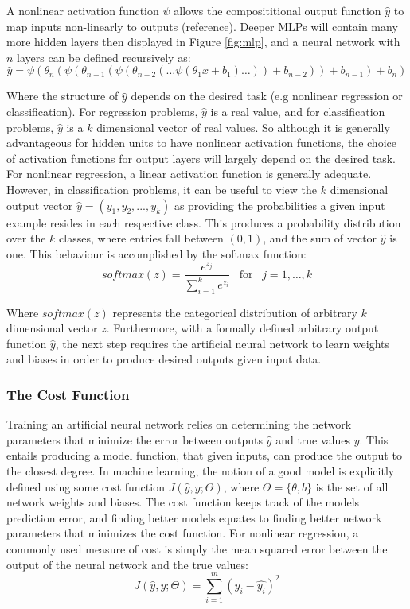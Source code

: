 A nonlinear activation function $\psi$ allows the composititional output function $ \hat{y}$ to map inputs non-linearly to outputs (reference). Deeper MLPs will contain many more hidden layers then displayed in Figure \ref{fig:mlp}, and a neural network with $n$ layers can be defined recursively as:
\begin{equation}
        \hat{y} = \psi(\theta_{n}(\psi(\theta_{n-1}(\psi(\theta_{n-2}(\ldots \psi(\theta_{1} x + b_{1}) \ldots)) + b_{n-2})) + b_{n-1}) + b_{n}) 
\end{equation}

Where the structure of $\hat{y}$ depends on the desired task (e.g nonlinear regression or classification). For regression problems, $\hat{y}$ is a real value, and for classification problems, $\hat{y}$ is a $k$ dimensional vector of real values. So although it is generally advantageous for hidden units to have nonlinear activation functions, the choice of activation functions for output layers will largely depend on the desired task. For nonlinear regression, a linear activation function is generally adequate. However, in classification problems, it can be useful to view the $k$ dimensional output vector $\hat{y} = (y_1,y_2,..., y_k)$ as providing the probabilities a given input example resides in each respective class. This produces a probability distribution over the $k$ classes, where entries fall between $(0,1)$, and the sum of vector $\hat{y}$ is one. This behaviour is accomplished by the softmax function:
\begin{equation}
       softmax(z) =  \frac{e^{z_j}}{\sum_{i=1}^{k}e^{z_i}} \;\;\; \mbox{for} \;\;\; j = 1,\ldots,k
\end{equation}

Where $softmax(z)$ represents the categorical distribution of arbitrary $k$ dimensional vector $z$. Furthermore, with a formally defined arbitrary output function $\hat{y}$, the next step requires the artificial neural network to learn weights and biases in order to produce desired outputs given input data.

\subsubsection{The Cost Function}
Training an artificial neural network relies on determining the network parameters that minimize the error between outputs $\hat{y}$ and true values $y$. This entails producing a model function, that given inputs, can produce the output to the closest degree. In machine learning, the notion of a good model is explicitly defined using some cost function $J(\hat{y},y;\Theta)$, where $\Theta = \{\theta, b\}$ is the set of all network weights and biases. The cost function keeps track of the models prediction error, and finding better models equates to finding better network parameters that minimizes the cost function. For nonlinear regression, a commonly used measure of cost is simply the mean squared error between the output of the neural network and the true values:
\begin{equation} \label{eq:mse} 
    J(\hat{y},y;\Theta) = \sum_{i=1}^{m}(y_i - \hat{y_i})^{2}
\end{equation}

